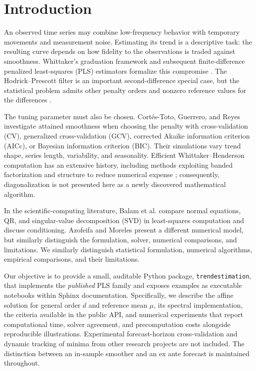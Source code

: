 \documentclass[pdflatex,sn-mathphys-ay]{sn-jnl}
\begin{document}

\maketitle

\section{Introduction}
An observed time series may combine low-frequency behavior with temporary movements and measurement noise. Estimating its trend is a descriptive task: the resulting curve depends on how fidelity to the observations is traded against smoothness. Whittaker's graduation framework and subsequent finite-difference penalized least-squares (PLS) estimators formalize this compromise \cite{whittaker1923graduation,guerrero2007penalized}. The Hodrick--Prescott filter is an important second-difference special case, but the statistical problem admits other penalty orders and nonzero reference values for the differences \cite{cortes2017smoothness}.

The tuning parameter must also be chosen. Cort\'es-Toto, Guerrero, and Reyes \cite{cortes2017smoothness} investigate attained smoothness when choosing the penalty with cross-validation (CV), generalized cross-validation (GCV), corrected Akaike information criterion (AICc), or Bayesian information criterion (BIC). Their simulations vary trend shape, series length, variability, and seasonality. Efficient Whittaker--Henderson computation has an extensive history, including methods exploiting banded factorization and structure to reduce numerical expense \cite{weinert2007wh}; consequently, diagonalization is not presented here as a newly discovered mathematical algorithm.

In the scientific-computing literature, Balam et al. \cite{balam2025overview} compare normal equations, QR, and singular-value decomposition (SVD) in least-squares computation and discuss conditioning. Azofeifa and Moreles \cite{azofeifa2025hybrid} present a different numerical model, but similarly distinguish the formulation, solver, numerical comparisons, and limitations. We similarly distinguish statistical formulation, numerical algorithms, empirical comparisons, and their limitations.

Our objective is to provide a small, auditable Python package, \texttt{trendestimation}, that implements the \emph{published} PLS family and exposes examples as executable notebooks within Sphinx documentation. Specifically, we describe the affine solution for general order $d$ and reference mean $\mu$, its spectral implementation, the criteria available in the public API, and numerical experiments that report computational time, solver agreement, and precomputation costs alongside reproducible illustrations. Experimental forecast-horizon cross-validation and dynamic tracking of minima from other research projects are not included. The distinction between an in-sample smoother and an ex ante forecast is maintained throughout.
\end{document}
